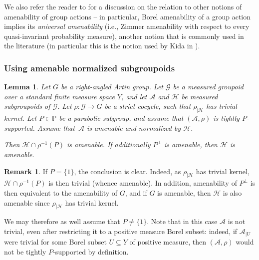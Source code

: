 \documentclass[11pt]{article}
\newcommand{\ie}{i.e.,\xspace}
\newcommand{\Subsubsection}{\subsubsection}
\numberwithin{equation}{section}
\let\mathcal\mathscr
\theoremstyle{plain}
\newtheorem{lemma}[theo]{Lemma}
\theoremstyle{definition}
\newtheorem{rk}[theo]{Remark}
\newcommand{\cala}{\mathcal{A}}
\newcommand{\calg}{\mathcal{G}}
\newcommand{\calh}{\mathcal{H}}
\begin{document}
We also refer the reader to \cite[\S 2]{GHL} for a discussion on the relation to other notions of amenability of group actions -- in particular, Borel amenability of a group action implies its \emph{universal amenability} (\ie Zimmer amenability with respect to every quasi-invariant probability measure), another notion that is commonly used in the literature (in particular this is the notion used by Kida in \cite{Kid-memoir}).

\Subsubsection{Using amenable normalized subgroupoids}

\begin{lemma}\label{lemma:amenable-normal}
Let $G$ be a right-angled Artin group. Let $\calg$ be a measured groupoid over a standard finite measure space $Y$, and let $\cala$ and $\calh$ be measured subgroupoids of $\calg$. Let $\rho:\calg\to G$ be a strict cocycle, such that $\rho_{|\calh}$ has trivial kernel. Let $P\in\mathbb{P}$ be a parabolic subgroup, and assume that $(\cala,\rho)$ is tightly $P$-supported. Assume that~$\cala$ is amenable and normalized by $\calh$.

Then $\calh\cap\rho^{-1}(P)$ is amenable. If additionally $P^{\perp}$ is amenable, then $\calh$ is amenable.
\end{lemma}

\begin{rk}
If $P=\{1\}$, the conclusion is clear. Indeed, as $\rho_{|\calh}$ has trivial kernel, $\calh\cap\rho^{-1}(P)$ is then trivial (whence amenable). In addition, amenability of $P^{\perp}$ is then equivalent to the amenability of $G$, and if $G$ is amenable, then $\calh$ is also amenable since $\rho_{|\calh}$ has trivial kernel.

We may therefore as well assume that $P\neq\{1\}$. Note that in this case $\cala$ is not trivial, even after restricting it to a positive measure Borel subset: indeed, if $\cala_{|U}$ were trivial for some Borel subset $U\subseteq Y$ of positive measure, then $(\cala,\rho)$ would not be tightly $P$-supported by definition.
\end{rk}
\end{document}
